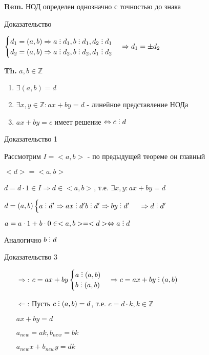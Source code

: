 \documentclass[14pt, letter paper]{article}
\DeclareRobustCommand{\divby}{%
  \mathrel{\text{\vbox{\baselineskip.65ex\lineskiplimit0pt\hbox{.}\hbox{.}\hbox{.}}}}%
}
\begin{document}
\textbf{Rem.} НОД определен однозначно с точностью до знака

\begin{center}
    Доказательство
\end{center}

$\begin{cases}
d_1 = (a, b) \Rightarrow a \divby d_1, b \divby d_1, d_2 \divby d_1 \\
d_2 = (a, b) \Rightarrow a \divby d_2, b \divby d_2, d_1 \divby d_2
\end{cases} \Rightarrow d_1 = \pm d_2$

\textbf{Th.} $a, b \in \mathds{Z}$

\begin{enumerate}
    \item $\exists (a, b) = d$
    \item $\exists x, y \in \mathds{Z}: ax + by = d$ - линейное представление НОДа
    \item $ax + by = c$ имеет решение $\Leftrightarrow c \divby d$
\end{enumerate}

\begin{center}
    Доказательство 1
\end{center}

Рассмотрим $I = <a, b>$ - по предыдущей теореме он главный

$<d> = <a, b>$

$d = d \cdot 1 \in I \Rightarrow d \in <a, b>$, т.е. $\exists x, y : ax + by = d$

$d = (a, b) \begin{cases}
    a \divby d' \Rightarrow ax \divby d'
    b \divby d' \Rightarrow by \divby d'
\end{cases}$
$\Rightarrow d \divby d'$

$a = a \cdot 1 + b \cdot 0 \in <a, b> = <d> \Leftrightarrow a \divby d$

Аналогично $b \divby d$

\begin{center}
    Доказательство 3
\end{center}

\begin{itemize}
    \item[$\Rightarrow$:] $c = ax + by \begin{cases} a \divby (a, b) \\ b \divby (a, b) \end{cases} \Rightarrow c = ax + by \divby (a, b)$
    \item[$\Leftarrow$:] Пусть $c \divby (a, b) = d$, т.е. $c = d \cdot k, k \in \mathds{Z}$
    
    $ax + by = d$

    $a_{new} = ak, b_{new} = bk$ 

    $a_{new}x + b_{new}y = dk$
\end{itemize}
\end{document}
